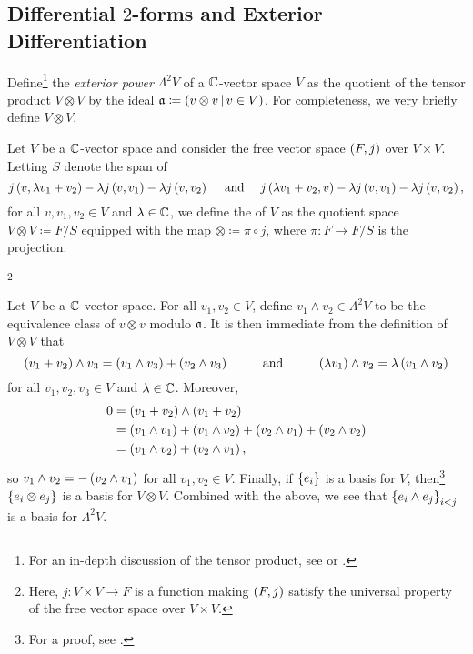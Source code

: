 \documentclass[../Moduli_Spaces_of_Riemann_Surfaces.tex]{subfiles}
\begin{document}
    \subsection{Differential $2$-forms and Exterior Differentiation}
    Define\footnote{For an in-depth discussion of the tensor product, see \cite[][Chapter 8.2]{aluffi} or \cite{conrad}.} the \textit{exterior power} $\Lambda^2V$ of a $\mathbb{C}$-vector space $V$ as the quotient of the tensor product $V\otimes V$ by the ideal $\mathfrak{a}\coloneqq\left(v\otimes v\,\middle\vert\, v\in V\right)$. For completeness, we very briefly define $V\otimes V$.
    \begin{definition}
        Let $V$ be a $\mathbb{C}$-vector space and consider the free vector space $\left(F,j\right)$ over $V\times V$. Letting $S$ denote the span of
        \begin{equation*}
            j\l(v,\lambda v_1+v_2\r)-\lambda j\l(v,v_1\r)-\lambda j\l(v,v_2\r)\ \ \ \ \textrm{and}\ \ \ \ j\l(\lambda v_1+v_2,v\r)-\lambda j\l(v,v_1\r)-\lambda j\l(v,v_2\r),
        \end{equation*}
        for all $v,v_1,v_2\in V$ and $\lambda\in\mathbb{C}$, we define the  of $V$ as the quotient space $V\otimes V\coloneqq F/S$ equipped with the map $\otimes\coloneqq\pi\circ j$, where $\pi:F\to F/S$ is the projection.
    \end{definition}
    \footnote{Here, $j:V\times V\to F$ is a function making $\left(F,j\right)$ satisfy the universal property of the free vector space over $V\times V$.}
    \vspace{-0.05in}
    \begin{remark}
        Let $V$ be a $\mathbb{C}$-vector space. For all $v_1,v_2\in V$, define $v_1\wedge v_2\in\Lambda^2V$ to be the equivalence class of $v\otimes v$ modulo $\mathfrak{a}$. It is then immediate from the definition of $V\otimes V$ that
        \begin{equation*}
            \l(v_1+v_2\r)\wedge v_3=\l(v_1\wedge v_3\r)+\l(v_2\wedge v_3\r)\ \ \ \ \ \ \ \ \textrm{and}\ \ \ \ \ \ \ \ \l(\lambda v_1\r)\wedge v_2=\lambda\l(v_1\wedge v_2\r)
        \end{equation*}
        for all $v_1,v_2,v_3\in V$ and $\lambda\in\mathbb{C}$. Moreover,
        \begin{equation*}
            \begin{aligned}
                0&=\left(v_1+v_2\right)\wedge\left(v_1+v_2\right) \\
                 &=\left(v_1\wedge v_1\right)+\left(v_1\wedge v_2\right)+\left(v_2\wedge v_1\right)+\left(v_2\wedge v_2\right) \\
                 &=\left(v_1\wedge v_2\right)+\left(v_2\wedge v_1\right),
            \end{aligned}
        \end{equation*}
        so $v_1\wedge v_2=-\left(v_2\wedge v_1\right)$ for all $v_1,v_2\in V$. Finally, if $\left\{e_i\right\}$ is a basis for $V$, then\footnote{For a proof, see \cite[][Proposition 12.8]{leeSM}.} $\left\{e_i\otimes e_j\right\}$ is a basis for $V\otimes V$. Combined with the above, we see that $\left\{e_i\wedge e_j\right\}_{i<j}$ is a basis for $\Lambda^2V$.\exqed
    \end{remark}
\end{document}

